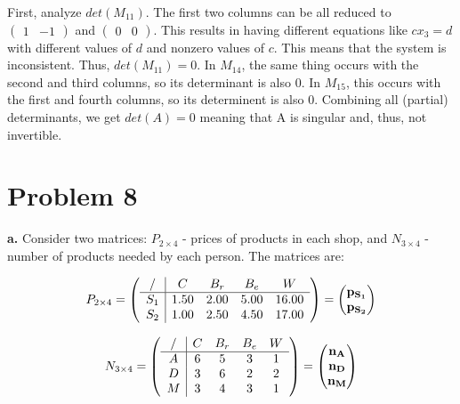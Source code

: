 \documentclass{article}
\begin{document}
  First, analyze $det(M_{11})$. The first two columns can be all reduced to $\begin{pmatrix} 1 & -1 \end{pmatrix}$ and $\begin{pmatrix} 0 & 0 \end{pmatrix}$. This results in having different equations like $cx_{3} = d$ with different values of $d$ and nonzero values of $c$. This means that the system is inconsistent. Thus, $det(M_{11}) = 0$. In $M_{14}$, the same thing occurs with the second and third columns, so its determinant is also $0$. In $M_{15}$, this occurs with the first and fourth columns, so its determinent is also $0$. Combining all (partial) determinants, we get $det(A) = 0$ meaning that A is singular and, thus, not invertible.

\section{Problem 8}

\textbf{a.} Consider two matrices: $P_{2\times4}$ - prices of products in each shop, and $N_{3\times4}$ - number of products needed by each person. The matrices are:

\begin{equation*}
  P_{2\times4} = 
  \left(
    \begin{array}{c|c c c c}
      / & C & B_{r} & B_{e} & W \\ \hline
      S_{1} & 1.50 & 2.00 & 5.00 & 16.00 \\
      S_{2} & 1.00 & 2.50 & 4.50 & 17.00
    \end{array}
  \right) =
  \begin{pmatrix}
    \mathbf{p_{S_{1}}} \\
    \mathbf{p_{S_{2}}}
  \end{pmatrix}
\end{equation*}

\begin{equation*}
  N_{3\times4} =
  \left(
    \begin{array}{c|c c c c}
      / & C & B_{r} & B_{e} & W \\ \hline
      A & 6 & 5 & 3 & 1 \\
      D & 3 & 6 & 2 & 2 \\
      M & 3 & 4 & 3 & 1
    \end{array}
  \right) =
  \begin{pmatrix}
    \mathbf{n_{A}} \\
    \mathbf{n_{D}} \\
    \mathbf{n_{M}}
  \end{pmatrix}
\end{equation*}
\end{document}
